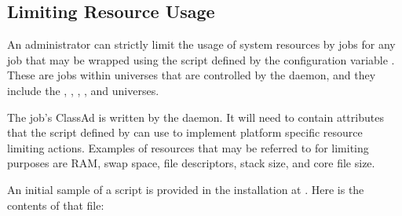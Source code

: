 \subsection{\label{sec:Resource-Limits}Limiting Resource Usage} 

An administrator can strictly limit the usage of system resources
by jobs for any job that may be wrapped using
the script defined by the configuration variable
.
These are jobs within universes that are controlled by the
 daemon, and they include 
the , , ,
, and  universes.

The job's ClassAd is written by the  daemon.
It will need to contain attributes that the script defined by
 can use to implement 
platform specific resource limiting actions.
Examples of resources that may be referred to for limiting purposes
are RAM, swap space, file descriptors, stack size, and core file size. 

An initial sample of a  script is provided
in the installation at
.
Here is the contents of that file:

